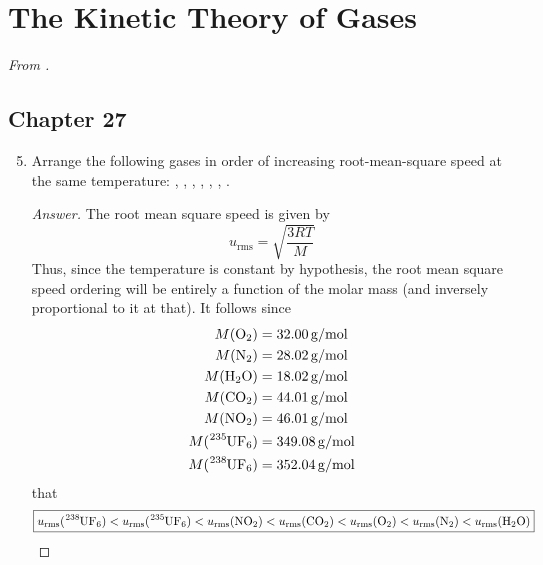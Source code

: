\documentclass[../psets.tex]{subfiles}
\begin{document}
\section{The Kinetic Theory of Gases}
\emph{From \textcite{bib:McQuarrieSimon}.}
\subsection*{Chapter 27}
\begin{enumerate}[label={\textbf{27-\arabic*.}},leftmargin=3.5em]
    \setcounter{enumi}{4}
    \item {}Arrange the following gases in order of increasing root-mean-square speed at the same temperature: , , , , , , .
    \begin{proof}[Answer]
        The root mean square speed is given by
        \begin{equation*}
            u_\text{rms} = \sqrt{\frac{3RT}{M}}
        \end{equation*}
        Thus, since the temperature is constant by hypothesis, the root mean square speed ordering will be entirely a function of the molar mass (and inversely proportional to it at that). It follows since
        \begin{align*}
            M(\ce{O2})        &= \SI[per-mode=symbol]{32.00}{\gram\per\mole}\\
            M(\ce{N2})        &= \SI[per-mode=symbol]{28.02}{\gram\per\mole}\\
            M(\ce{H2O})       &= \SI[per-mode=symbol]{18.02}{\gram\per\mole}\\
            M(\ce{CO2})       &= \SI[per-mode=symbol]{44.01}{\gram\per\mole}\\
            M(\ce{NO2})       &= \SI[per-mode=symbol]{46.01}{\gram\per\mole}\\
            M(\ce{{}^235UF6}) &= \SI[per-mode=symbol]{349.08}{\gram\per\mole}\\
            M(\ce{{}^238UF6}) &= \SI[per-mode=symbol]{352.04}{\gram\per\mole}
        \end{align*}
        that
        \begin{equation*}
            \boxed{
                u_\text{rms}(\ce{{}^238UF6}) < u_\text{rms}(\ce{{}^235UF6})
                < u_\text{rms}(\ce{NO2})
                < u_\text{rms}(\ce{CO2})
                < u_\text{rms}(\ce{O2})
                < u_\text{rms}(\ce{N2})
                < u_\text{rms}(\ce{H2O})
            }

\end{equation*}
\end{proof}
\end{enumerate}
\end{document}
